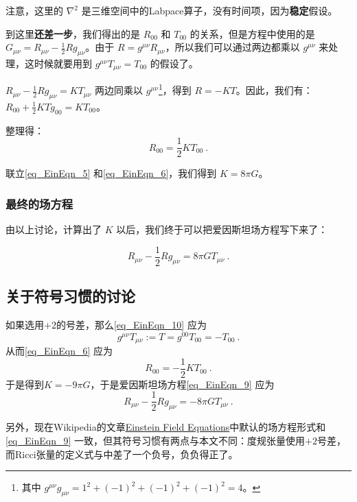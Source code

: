 注意，这里的 $\nabla^2$ 是三维空间中的Labpace算子，没有时间项，因为\textbf{稳定}假设。


到这里\textbf{还差一步}，我们得出的是 $R_{00}$ 和 $T_{00}$ 的关系，但是方程中使用的是 $G_{\mu\nu}=R_{\mu\nu}-\frac{1}{2}Rg_{\mu\nu}$。由于 $R=g^{\mu\nu}R_{\mu\nu}$，所以我们可以通过两边都乘以 $g^{\mu\nu}$ 来处理，这时候就要用到 $g^{\mu\nu}T_{\mu\nu}=T_{00}$ 的假设了。

$R_{\mu\nu}-\frac{1}{2}Rg_{\mu\nu}=KT_{\mu\nu}$ 两边同乘以 $g^{\mu\nu}$\footnote{其中 $g^{\mu\nu}g_{\mu\nu}=1^2+(-1)^2+(-1)^2+(-1)^2=4$。}，得到 $R=-KT$。因此，我们有：$R_{00}+\frac{1}{2}KTg_{00}=KT_{00}$。



整理得：
\begin{equation}\label{eq_EinEqn_6}
R_{00}=\frac{1}{2}KT_{00}~.
\end{equation}

联立\autoref{eq_EinEqn_5} 和\autoref{eq_EinEqn_6}，我们得到 $K=8\pi G$。

\subsubsection{最终的场方程}

由以上讨论，计算出了 $K$ 以后，我们终于可以把爱因斯坦场方程写下来了：

\begin{equation}\label{eq_EinEqn_9}
R_{\mu\nu}-\frac{1}{2}Rg_{\mu\nu}=8\pi GT_{\mu\nu}~.
\end{equation}





\subsection{关于符号习惯的讨论}


如果选用$+2$的号差，那么\autoref{eq_EinEqn_10} 应为
\begin{equation}
g^{\mu\nu}T_{\mu\nu}:=T=g^{00}T_{00}=-T_{00}~.
\end{equation}
从而\autoref{eq_EinEqn_6}  应为
\begin{equation}
R_{00}=-\frac{1}{2}KT_{00}~.
\end{equation}
于是得到$K=-9\pi G$，于是爱因斯坦场方程\autoref{eq_EinEqn_9} 应为
\begin{equation}
R_{\mu\nu}-\frac{1}{2}Rg_{\mu\nu}=-8\pi GT_{\mu\nu}~.
\end{equation}

另外，现在Wikipedia的文章\href{https://en.wikipedia.org/wiki/Einstein_field_equations}{Einstein Field Equations}中默认的场方程形式和\autoref{eq_EinEqn_9} 一致，但其符号习惯有两点与本文不同：度规张量使用$+2$号差，而Ricci张量的定义式与中差了一个负号，负负得正了。











